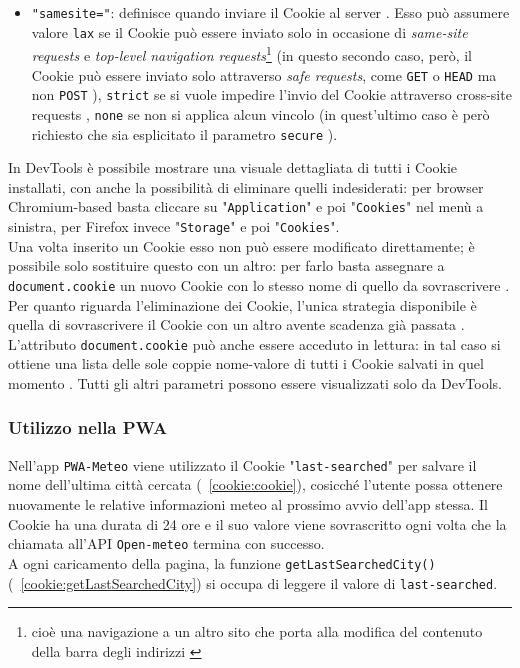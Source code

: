 \documentclass[a4paper, 12pt, twoside, openright]{book}
\begin{document}
\begin{itemize}
\item\texttt{"samesite="}: definisce quando inviare il Cookie al server \cite{MDN_Web_docs:cookies}. Esso può assumere valore \texttt{lax} se il Cookie può essere inviato solo in occasione di \textit{same-site requests} e \textit{top-level navigation requests}\footnote{cioè una navigazione a un altro sito che porta alla modifica del contenuto della barra degli indirizzi \cite{Stack_overflow:samesite}} \cite{MDN_Web_docs:cookies} (in questo secondo caso, però, il Cookie può essere inviato solo attraverso \textit{safe requests}, come \texttt{GET} o \texttt{HEAD} ma non \texttt{POST} \cite{Stack_overflow:samesite}), \texttt{strict} se si vuole impedire l'invio del Cookie attraverso cross-site requests \cite{MDN_Web_docs:cookies}, \texttt{none} se non si applica alcun vincolo \cite{MDN_Web_docs:cookies} (in quest'ultimo caso è però richiesto che sia esplicitato il parametro \texttt{secure} \cite{MDN_Web_docs:HTTP_cookies}).
\end{itemize}
In DevTools è possibile mostrare una visuale dettagliata di tutti i Cookie installati, con anche la possibilità di eliminare quelli indesiderati: per browser Chromium-based basta cliccare su "\texttt{Application}" e poi "\texttt{Cookies}" nel menù a sinistra, per Firefox invece "\texttt{Storage}" e poi "\texttt{Cookies}".\\
Una volta inserito un Cookie esso non può essere modificato direttamente; è possibile solo sostituire questo con un altro: per farlo basta assegnare a \texttt{document.cookie} un nuovo Cookie con lo stesso nome di quello da sovrascrivere \cite{W3Schools:cookies}.\\
Per quanto riguarda l'eliminazione dei Cookie, l'unica strategia disponibile è quella di sovrascrivere il Cookie con un altro avente scadenza già passata \cite{W3Schools:cookies}.\\
L'attributo \texttt{document.cookie} può anche essere acceduto in lettura: in tal caso si ottiene una lista delle sole coppie nome-valore di tutti i Cookie salvati in quel momento \cite{MDN_Web_docs:cookies}. Tutti gli altri parametri possono essere visualizzati solo da DevTools.
\subsubsection{Utilizzo nella PWA}
Nell'app \texttt{PWA-Meteo} viene utilizzato il Cookie "\texttt{last-searched}" per salvare il nome dell'ultima città cercata (\figurename~\ref{cookie:cookie}), cosicché l'utente possa ottenere nuovamente le relative informazioni meteo al prossimo avvio dell'app stessa. Il Cookie ha una durata di 24 ore e il suo valore viene sovrascritto ogni volta che la chiamata all'API \texttt{Open-meteo} termina con successo.\\
A ogni caricamento della pagina, la funzione \texttt{getLastSearchedCity()} (\figurename~\ref{cookie:getLastSearchedCity}) si occupa di leggere il valore di \texttt{last-searched}.
\end{document}
